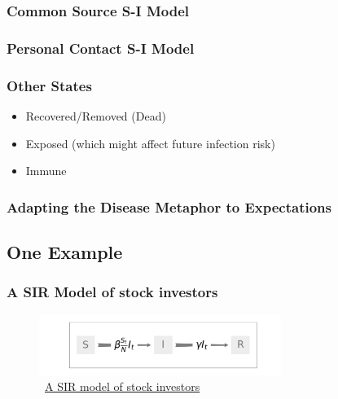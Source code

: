 \documentclass[pdflatex]{beamer}
\begin{document}
\begin{frame}\frametitle{Common Source S-I Model}

\end{frame}

\begin{frame}\frametitle{Personal Contact S-I Model}
    
\end{frame}

\begin{frame}\frametitle{Other States}
\begin{itemize}
    \item Recovered/Removed (Dead)
    \item Exposed (which might affect future infection risk)
    \item Immune
\end{itemize}
\end{frame}

\subsubsection{Adapting the Disease Metaphor to Expectations}\label{subsubsec:AdaptingTheModel}

\hypertarget{AdaptingTheModel}{}


\subsection{One Example}
\label{subsec:shillerpound}

\begin{frame}
	\frametitle{A SIR Model of stock investors \citep{shiller1989survey} }
	\begin{figure}[!ht] \centering  %
		\caption{ ~\href{https://mybinder.org/v2/gh/llorracc/EpiExp/HEAD?filepath=SIR_Ndlib.ipynb}{A SIR model of stock investors}}
		\label{fig:sir_diagram}
		\centerline{\includegraphics[width=0.7\textwidth]{./figures/flow_diagram}}
	\end{figure}
\end{frame}
\end{document}
